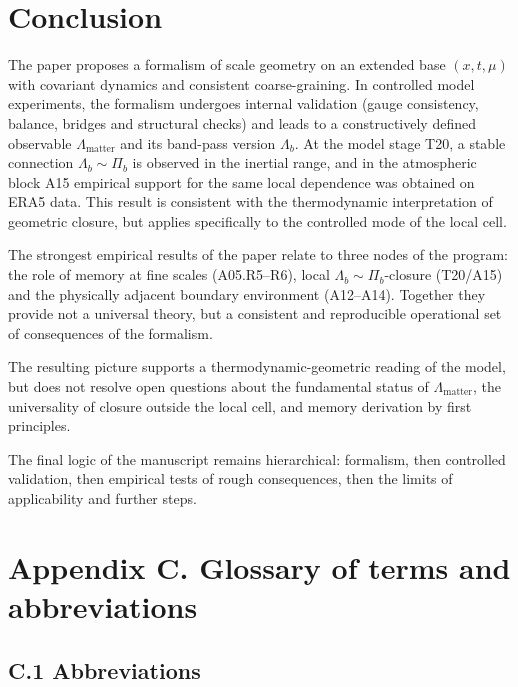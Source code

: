 \documentclass[11pt,a4paper]{article}
\theoremstyle{definition}
\theoremstyle{plain}
\theoremstyle{remark}
\begin{document}
\section{Conclusion}
\label{sec:conclusion}

The paper proposes a formalism of scale geometry on an extended base $(x,t,\mu)$ with covariant dynamics and consistent coarse-graining.
In controlled model experiments, the formalism undergoes internal validation (gauge consistency, balance, bridges and structural checks) and leads to a constructively defined observable $\Lambda_{\mathrm{matter}}$ and its band-pass version $\Lambda_b$.
At the model stage T20, a stable connection \(\Lambda_b\sim\Pi_b\) is observed in the inertial range, and in the atmospheric block A15 empirical support for the same local dependence was obtained on ERA5 data. This result is consistent with the thermodynamic interpretation of geometric closure, but applies specifically to the controlled mode of the local cell.

The strongest empirical results of the paper relate to three nodes of the program: the role of memory at fine scales (A05.R5--R6), local $\Lambda_b\sim\Pi_b$-closure (T20/A15) and the physically adjacent boundary environment (A12--A14). Together they provide not a universal theory, but a consistent and reproducible operational set of consequences of the formalism.

The resulting picture supports a thermodynamic-geometric reading of the model, but does not resolve open questions about the fundamental status of $\Lambda_{\mathrm{matter}}$, the universality of closure outside the local cell, and memory derivation by first principles.

The final logic of the manuscript remains hierarchical:
formalism, then controlled validation, then empirical tests of rough consequences, then the limits of applicability and further steps.

\appendix
\newpage

\section*{Appendix C. Glossary of terms and abbreviations}
\label{sec:appendix:glossary}

\subsection*{C.1 Abbreviations}
\end{document}

